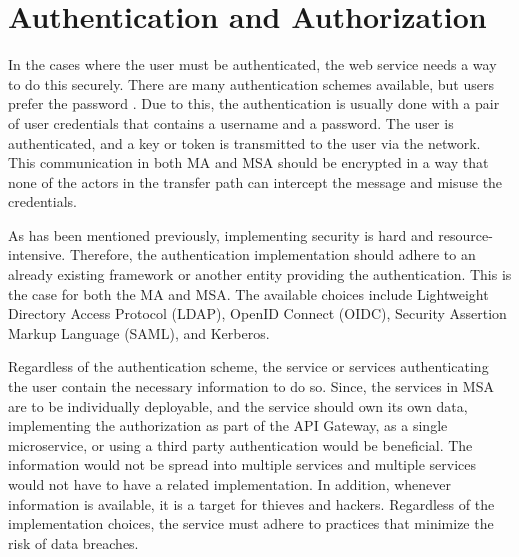 \section{Authentication and Authorization}
\begin{sloppypar}
    In the cases where the user must be authenticated, the web service needs a
    way to do this securely. There are many authentication schemes available,
    but users prefer the password \citep{passwordisdead}. Due to this, the
    authentication is usually done with a pair of user credentials that contains
    a username and a password. The user is authenticated, and a key or token is
    transmitted to the user via the network. This communication in both MA and
    MSA should be encrypted in a way that none of the actors in the transfer
    path can intercept the message and misuse the credentials.
\end{sloppypar}
\begin{sloppypar}
    As has been mentioned previously, implementing security is hard and
    resource-intensive. Therefore, the authentication implementation should
    adhere to an already existing framework or another entity providing the
    authentication. This is the case for both the MA and MSA. The available
    choices include Lightweight Directory Access Protocol (LDAP), OpenID Connect
    (OIDC), Security Assertion Markup Language (SAML), and Kerberos.
\end{sloppypar}
\begin{sloppypar}
    Regardless of the authentication scheme, the service or services
    authenticating the user contain the necessary information to do so. Since,
    the services in MSA are to be individually deployable, and the service
    should own its own data, implementing the authorization as part of the API
    Gateway, as a single microservice, or using a third party authentication
    would be beneficial. The information would not be spread into multiple
    services and multiple services would not have to have a related
    implementation. In addition, whenever information is available, it is a
    target for thieves and hackers. Regardless of the implementation choices,
    the service must adhere to practices that minimize the risk of data
    breaches.
\end{sloppypar}


